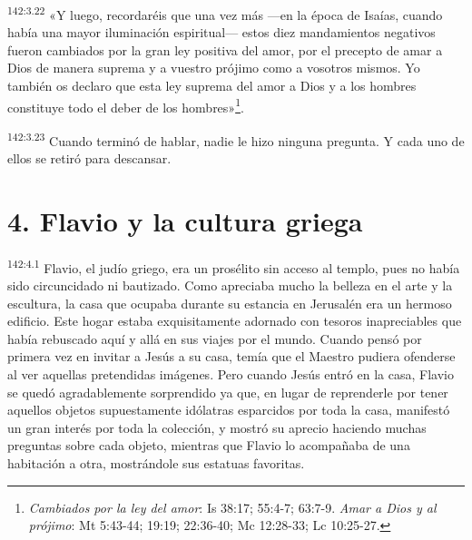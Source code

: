 \par 
\textsuperscript{142:3.22} «Y luego, recordaréis que una vez más ---en la época de Isaías, cuando había una mayor iluminación espiritual--- estos diez mandamientos negativos fueron cambiados por la gran ley positiva del amor, por el precepto de amar a Dios de manera suprema y a vuestro prójimo como a vosotros mismos. Yo también os declaro que esta ley suprema del amor a Dios y a los hombres constituye todo el deber de los hombres»\footnote{\textit{Cambiados por la ley del amor}: Is 38:17; 55:4-7; 63:7-9. \textit{Amar a Dios y al prójimo}: Mt 5:43-44; 19:19; 22:36-40; Mc 12:28-33; Lc 10:25-27.}.

\par 
\textsuperscript{142:3.23} Cuando terminó de hablar, nadie le hizo ninguna pregunta. Y cada uno de ellos se retiró para descansar.

\section*{4. Flavio y la cultura griega}
\par 
\textsuperscript{142:4.1} Flavio, el judío griego, era un prosélito sin acceso al templo, pues no había sido circuncidado ni bautizado. Como apreciaba mucho la belleza en el arte y la escultura, la casa que ocupaba durante su estancia en Jerusalén era un hermoso edificio. Este hogar estaba exquisitamente adornado con tesoros inapreciables que había rebuscado aquí y allá en sus viajes por el mundo. Cuando pensó por primera vez en invitar a Jesús a su casa, temía que el Maestro pudiera ofenderse al ver aquellas pretendidas imágenes. Pero cuando Jesús entró en la casa, Flavio se quedó agradablemente sorprendido ya que, en lugar de reprenderle por tener aquellos objetos supuestamente idólatras esparcidos por toda la casa, manifestó un gran interés por toda la colección, y mostró su aprecio haciendo muchas preguntas sobre cada objeto, mientras que Flavio lo acompañaba de una habitación a otra, mostrándole sus estatuas favoritas.

